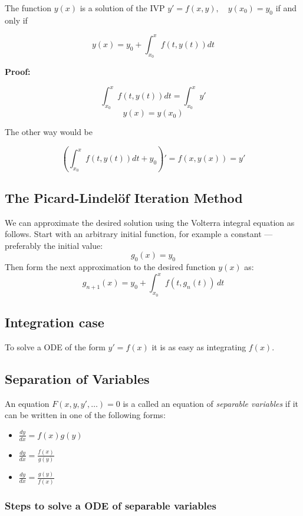 The function \(y(x)\) is a solution of the IVP \(y' = f(x,y),\quad y(x_0) = y_0\) if and only if

\[y(x) = y_0 + \int_{x_0}^{x} f(t, y(t))dt\]

\textbf{Proof:}

\[\int_{x_0}^{x} f(t, y(t))dt = \int_{x_0}^{x} y'\]
\[y(x) = y(x_0)\]

The other way would be

\[\left(\int_{x_0}^{x} f(t, y(t))dt + y_0\right)' = f(x, y(x)) = y' \]

\QED

\subsection{The Picard-Lindelöf Iteration Method}

We can approximate the desired solution using the Volterra integral equation as follows. Start with an arbitrary initial function, for example a constant — preferably the initial value:
\[
g_0(x) = y_0
\]
Then form the next approximation to the desired function \( y(x) \) as:
\[
g_{n+1}(x) = y_0 + \int_{x_0}^{x} f(t, g_n(t)) \, dt
\]

\subsection{Integration case}

To solve a ODE of the form \(y' = f(x)\) it is as easy as integrating \(f(x)\).

\subsection{Separation of Variables}

An equation \(F(x,y,y',\dots) = 0\) is a called an equation of \emph{separable variables} if it can
be written in one of the following forms:

\begin{itemize}[label=\(-\)]
    \item \(\frac{dy}{dx} = f(x) g(y)\)
    \item \(\frac{dy}{dx} = \frac{f(x)}{g(y)}\)
     \item \(\frac{dy}{dx} = \frac{g(y)}{f(x)}\)
\end{itemize}

\subsubsection{Steps to solve a ODE of separable variables}

